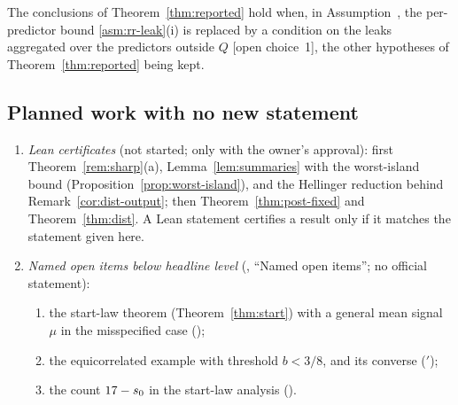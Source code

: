 
\begin{planthm}\label{thm:agg-leak}
The conclusions of Theorem~\ref{thm:reported} hold when, in Assumption~, the per-predictor bound
\ref{asm:rr-leak}(i) is replaced by a condition on the leaks aggregated over the predictors outside $Q$
\textup{[open choice~1]}, the other hypotheses of Theorem~\ref{thm:reported} being kept.
\end{planthm}



\subsection{Planned work with no new statement}\label{sec:planned-other}

\begin{enumerate}[leftmargin=1.6em,itemsep=1pt]
  \item \emph{Lean certificates} (not started; only with the owner's approval): first Theorem~\ref{rem:sharp}(a),
    Lemma~\ref{lem:summaries} with the worst-island bound (Proposition~\ref{prop:worst-island}), and the Hellinger
    reduction behind Remark~\ref{cor:dist-output}; then Theorem~\ref{thm:post-fixed} and Theorem~\ref{thm:dist}. A Lean
    statement certifies a result only if it matches the statement given here.
  \item \emph{Named open items below headline level} (, ``Named open items''; no official
    statement): \begin{enumerate}[label=(\alph*),leftmargin=1.6em,itemsep=0pt]
      \item the start-law theorem (Theorem~\ref{thm:start}) with a general mean signal $\mu$ in the misspecified case
        ();
      \item the equicorrelated example with threshold $b<3/8$, and its converse ($'$);
      \item the count $17-s_0$ in the start-law analysis ().
    \end{enumerate}
\end{enumerate}
